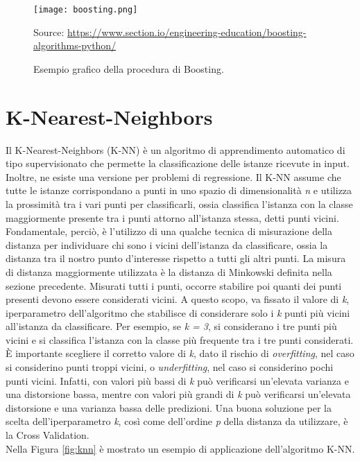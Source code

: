 \begin{figure}[h]
	\begin{center}
		\texttt{[image: boosting.png]}
		\caption{Esempio grafico della procedura di Boosting.
		} 
		Source: \url{https://www.section.io/engineering-education/boosting-algorithms-python/}\label{fig:boosting}
	\end{center}
\end{figure}

\section{K-Nearest-Neighbors}
Il K-Nearest-Neighbors (K-NN) \autocite{dasarathy1991nearest} è un algoritmo di apprendimento automatico di tipo supervisionato che permette la classificazione delle istanze ricevute in input. Inoltre, ne esiste una versione per problemi di regressione. Il K-NN assume che tutte le istanze corrispondano a punti in uno spazio di dimensionalità \emph{n} e utilizza la prossimità tra i vari punti per classificarli, ossia classifica l'istanza con la classe maggiormente presente tra i punti attorno all'istanza stessa, detti punti vicini. Fondamentale, perciò, è l'utilizzo di una qualche tecnica di misurazione della distanza per individuare chi sono i vicini dell'istanza da classificare, ossia la distanza tra il nostro punto d'interesse rispetto a tutti gli altri punti. La misura di distanza maggiormente utilizzata è la distanza di Minkowski definita nella sezione precedente. Misurati tutti i punti, occorre stabilire poi quanti dei punti presenti devono essere considerati vicini. A questo scopo, va fissato il valore di \emph{k}, iperparametro dell'algoritmo che stabilisce di considerare solo i \emph{k} punti più vicini all'istanza da classificare. Per esempio, se \emph{k = 3}, si considerano i tre punti più vicini e si classifica l'istanza con la classe più frequente tra i tre punti considerati. È importante scegliere il corretto valore di \emph{k}, dato il rischio di \emph{overfitting}, nel caso si considerino punti troppi vicini, o \emph{underfitting}, nel caso si considerino pochi punti vicini. Infatti, con valori più bassi di \emph{k} può verificarsi un'elevata varianza e una distorsione bassa, mentre con valori più grandi di \emph{k} può verificarsi un'elevata distorsione e una varianza bassa delle predizioni. Una buona soluzione per la scelta dell'iperparametro \emph{k}, così come dell'ordine \emph{p} della distanza da utilizzare, è la Cross Validation.\\
Nella Figura \ref{fig:knn} è mostrato un esempio di applicazione dell'algoritmo K-NN.\\
